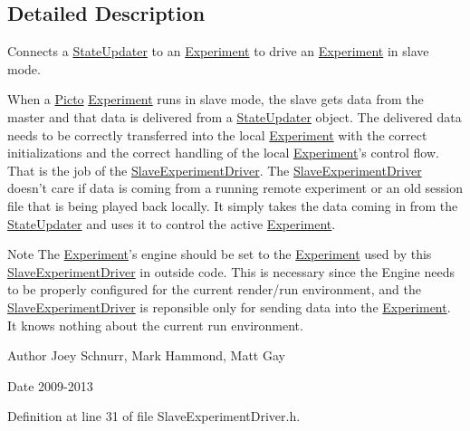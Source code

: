 \subsection{Detailed Description}
Connects a \hyperlink{class_picto_1_1_state_updater}{State\-Updater} to an \hyperlink{class_picto_1_1_experiment}{Experiment} to drive an \hyperlink{class_picto_1_1_experiment}{Experiment} in slave mode. 

When a \hyperlink{namespace_picto}{Picto} \hyperlink{class_picto_1_1_experiment}{Experiment} runs in slave mode, the slave gets data from the master and that data is delivered from a \hyperlink{class_picto_1_1_state_updater}{State\-Updater} object. The delivered data needs to be correctly transferred into the local \hyperlink{class_picto_1_1_experiment}{Experiment} with the correct initializations and the correct handling of the local \hyperlink{class_picto_1_1_experiment}{Experiment}'s control flow. That is the job of the \hyperlink{class_picto_1_1_slave_experiment_driver}{Slave\-Experiment\-Driver}. The \hyperlink{class_picto_1_1_slave_experiment_driver}{Slave\-Experiment\-Driver} doesn't care if data is coming from a running remote experiment or an old session file that is being played back locally. It simply takes the data coming in from the \hyperlink{class_picto_1_1_state_updater}{State\-Updater} and uses it to control the active \hyperlink{class_picto_1_1_experiment}{Experiment}. \begin{DoxyNote}{Note}
The \hyperlink{class_picto_1_1_experiment}{Experiment}'s engine should be set to the \hyperlink{class_picto_1_1_experiment}{Experiment} used by this \hyperlink{class_picto_1_1_slave_experiment_driver}{Slave\-Experiment\-Driver} in outside code. This is necessary since the Engine needs to be properly configured for the current render/run environment, and the \hyperlink{class_picto_1_1_slave_experiment_driver}{Slave\-Experiment\-Driver} is reponsible only for sending data into the \hyperlink{class_picto_1_1_experiment}{Experiment}. It knows nothing about the current run environment. 
\end{DoxyNote}
\begin{DoxyAuthor}{Author}
Joey Schnurr, Mark Hammond, Matt Gay 
\end{DoxyAuthor}
\begin{DoxyDate}{Date}
2009-\/2013 
\end{DoxyDate}


Definition at line 31 of file Slave\-Experiment\-Driver.\-h.



